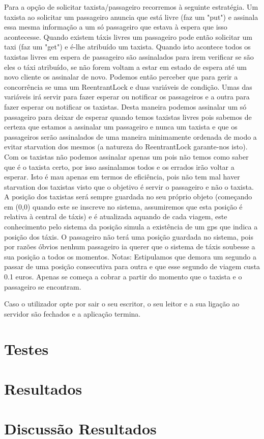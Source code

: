 Para a opção de solicitar taxista/passageiro recorremos à seguinte estratégia. Um taxista ao solicitar um passageiro anuncia que está livre (faz um "put") e assinala essa mesma informação a um só passageiro que estava à espera que isso acontecesse. Quando existem táxis livres um passageiro pode então solicitar um taxi (faz um "get") e é-lhe atribuído um taxista. Quando isto acontece todos os taxistas livres em espera de passageiro são assinalados para irem verificar se são eles o táxi atribuído, se não forem voltam a estar em estado de espera até um novo cliente os assinalar de novo. Podemos então perceber que para gerir a concorrência se uma um ReentrantLock e duas variáveis de condição. Umas das variáveis irá servir para fazer esperar ou notificar os passageiros e a outra para fazer esperar ou notificar os taxistas. Desta maneira podemos assinalar um só passageiro para deixar de esperar quando temos taxistas livres pois sabemos de certeza que estamos a assinalar um passageiro e nunca um taxista e que os passageiros serão assinalados de uma maneira minimamente ordenada de modo a evitar starvation dos mesmos (a natureza do ReentrantLock garante-nos isto). Com os taxistas não podemos assinalar apenas um pois não temos como saber que é o taxista certo, por isso assinalamos todos e os errados irão voltar a esperar. Isto é mau apenas em termos de eficiência, pois não tem mal haver starvation dos taxistas visto que o objetivo é servir o passageiro e não o taxista. A posição dos taxistas será sempre guardada no seu próprio objeto (começando em (0,0) quando este se inscreve no sistema, assumiremos que esta posição é relativa à central de táxis) e é atualizada aquando de cada viagem, este conhecimento pelo sistema da posição simula a existência de um gps que indica a posição dos táxis. O passageiro não terá uma posição guardada no sistema, pois por razões óbvios nenhum passageiro ia querer que o sistema de táxis soubesse a sua posição a todos os momentos.
Notas: Estipulamos que demora um segundo a passar de uma posição consecutiva para outra e que esse segundo de viagem custa 0.1 euros. Apenas se começa a cobrar a partir do momento que o taxista e o passageiro se encontram. 

Caso o utilizador opte por sair o seu escritor, o seu leitor e a sua ligação ao servidor são fechados e a aplicação termina.


\section{Testes}


\section{Resultados}

\section{Discussão Resultados}




